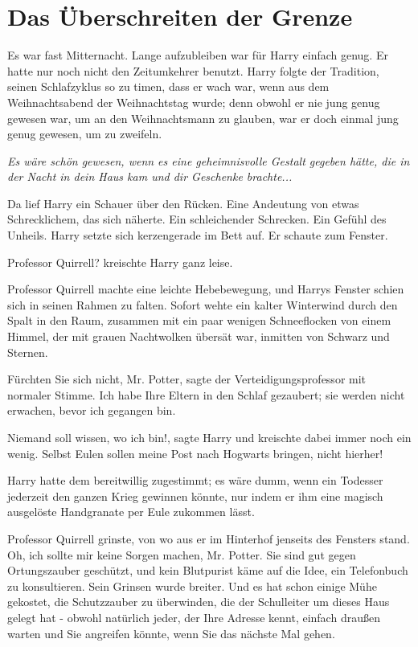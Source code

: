 \chapter{Das Überschreiten der Grenze}

Es war fast Mitternacht. Lange aufzubleiben war für Harry einfach genug. Er
hatte nur noch nicht den Zeitumkehrer benutzt. Harry folgte der Tradition,
seinen Schlafzyklus so zu timen, dass er wach war, wenn aus dem Weihnachtsabend
der Weihnachtstag wurde; denn obwohl er nie jung genug gewesen war, um an den
Weihnachtsmann zu glauben, war er doch einmal jung genug gewesen, um zu
zweifeln.

\emph{Es wäre schön gewesen, wenn es eine geheimnisvolle Gestalt gegeben hätte,
die in der Nacht in dein Haus kam und dir Geschenke brachte...}

Da lief Harry ein Schauer über den Rücken. Eine Andeutung von etwas
Schrecklichem, das sich näherte. Ein schleichender Schrecken. Ein Gefühl des
Unheils. Harry setzte sich kerzengerade im Bett auf. Er schaute zum Fenster.

\glqq{}Professor Quirrell?\grqq{} kreischte Harry ganz leise.

Professor Quirrell machte eine leichte Hebebewegung, und Harrys Fenster schien
sich in seinen Rahmen zu falten. Sofort wehte ein kalter Winterwind durch den
Spalt in den Raum, zusammen mit ein paar wenigen Schneeflocken von einem Himmel,
der mit grauen Nachtwolken übersät war, inmitten von Schwarz und Sternen.

\glqq{}Fürchten Sie sich nicht, Mr. Potter\grqq{}, sagte der
Verteidigungsprofessor mit normaler Stimme. \glqq{}Ich habe Ihre Eltern in den
Schlaf gezaubert; sie werden nicht erwachen, bevor ich gegangen bin.\grqq{}

\glqq{}Niemand soll wissen, wo ich bin!\grqq{}, sagte Harry und kreischte dabei
immer noch ein wenig. \glqq{}Selbst Eulen sollen meine Post nach Hogwarts
bringen, nicht hierher!\grqq{}

Harry hatte dem bereitwillig zugestimmt; es wäre dumm, wenn ein Todesser
jederzeit den ganzen Krieg gewinnen könnte, nur indem er ihm eine magisch
ausgelöste Handgranate per Eule zukommen lässt.

Professor Quirrell grinste, von wo aus er im Hinterhof jenseits des Fensters
stand. \glqq{}Oh, ich sollte mir keine Sorgen machen, Mr. Potter. Sie sind gut
gegen Ortungszauber geschützt, und kein Blutpurist käme auf die Idee, ein
Telefonbuch zu konsultieren.\grqq{} Sein Grinsen wurde breiter. \glqq{}Und es hat
schon einige Mühe gekostet, die Schutzzauber zu überwinden, die der Schulleiter
um dieses Haus gelegt hat - obwohl natürlich jeder, der Ihre Adresse kennt,
einfach draußen warten und Sie angreifen könnte, wenn Sie das nächste Mal
gehen.\grqq{}

